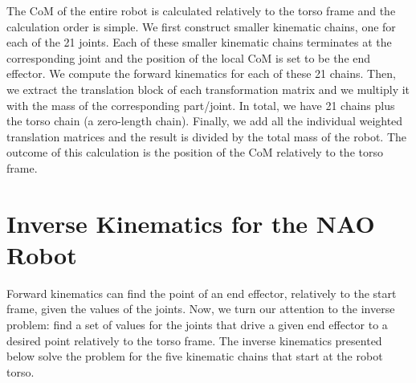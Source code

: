 The CoM of the entire robot is calculated relatively to the torso frame and the calculation order is simple. We first construct smaller kinematic chains, one for each of the 21 joints. Each of these smaller kinematic chains terminates at the corresponding joint and the position of the local CoM is set to be the end effector. We compute the forward kinematics for each of these 21 chains. Then, we extract the translation block of each transformation matrix and we multiply it with the mass of the corresponding part/joint. In total, we have 21 chains plus the torso chain (a zero-length chain). Finally, we add all the individual weighted translation matrices and the result is divided by the total mass of the robot. The outcome of this calculation is the position of the CoM relatively to the torso frame.











\section{Inverse Kinematics for the NAO Robot}


Forward kinematics can find the point of an end effector, relatively to the start frame, given the values of the joints. Now, we turn our attention to the inverse problem: find a set of values for the joints that drive a given end effector to a desired point relatively to the torso frame. The inverse kinematics presented below solve the problem for the five kinematic chains that start at the robot torso.

